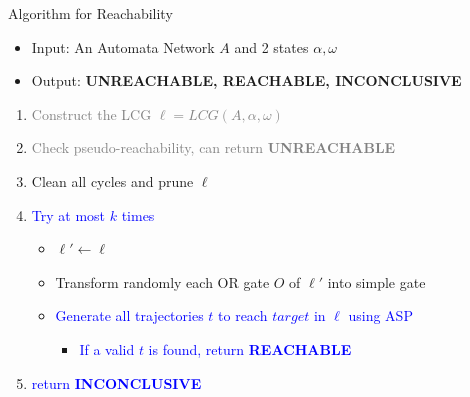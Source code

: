 \documentclass[8pt]{beamer}
\begin{document}
\begin{frame}{Algorithm for Reachability}
    \begin{itemize}
    \item Input: An Automata Network $A$ and 2 states $\alpha, \omega$ 
    \item Output: \textbf{UNREACHABLE, REACHABLE, INCONCLUSIVE}
\end{itemize}
\begin{enumerate}
    \item \textcolor{gray}{Construct the LCG $\ell=LCG(A,\alpha,\omega)$}
    \item \textcolor{gray}{Check pseudo-reachability, can return \textbf{UNREACHABLE}}
    \item Clean all cycles and prune $\ell$
    \item \textcolor{blue}{Try at most $k$ times}
    \begin{itemize}
        \item {$\ell'\gets \ell$}
        \item { Transform randomly each OR gate $O$ of $\ell'$ into simple gate}
        \item \textcolor{blue}{ Generate all trajectories $t$ to reach $target$ in $\ell$ using ASP}
        \begin{itemize}
            \item\textcolor{blue}{If a valid $t$ is found, return \textbf{REACHABLE}}
        \end{itemize}
    \end{itemize}
    \item\textcolor{blue}{return \textbf{INCONCLUSIVE}}
\end{enumerate}
\end{frame}
\end{document}
